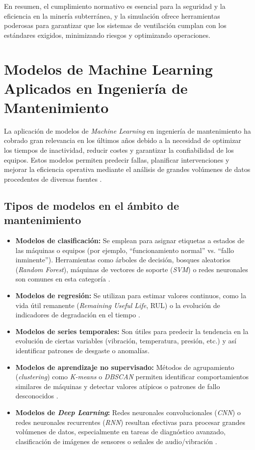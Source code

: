 En resumen, el cumplimiento normativo es esencial para la seguridad y la eficiencia en la minería subterránea, y la simulación ofrece herramientas poderosas para garantizar que los sistemas de ventilación cumplan con los estándares exigidos, minimizando riesgos y optimizando operaciones.

\section{Modelos de Machine Learning Aplicados en Ingeniería de Mantenimiento}

La aplicación de modelos de \textit{Machine Learning} en ingeniería de mantenimiento ha cobrado gran relevancia en los últimos años debido a la necesidad de optimizar los tiempos de inactividad, reducir costes y garantizar la confiabilidad de los equipos. Estos modelos permiten predecir fallas, planificar intervenciones y mejorar la eficiencia operativa mediante el análisis de grandes volúmenes de datos procedentes de diversas fuentes \cite{bishop2006, montgomery2009}.

\subsection{Tipos de modelos en el ámbito de mantenimiento}

\begin{itemize}
    \item \textbf{Modelos de clasificación:} Se emplean para asignar etiquetas a estados de las máquinas o equipos (por ejemplo, “funcionamiento normal” vs. “fallo inminente”). Herramientas como árboles de decisión, bosques aleatorios (\textit{Random Forest}), máquinas de vectores de soporte (\textit{SVM}) o redes neuronales son comunes en esta categoría \cite{zhang2020}.

    \item \textbf{Modelos de regresión:} Se utilizan para estimar valores continuos, como la vida útil remanente (\textit{Remaining Useful Life}, RUL) o la evolución de indicadores de degradación en el tiempo \cite{bishop2006}.

    \item \textbf{Modelos de series temporales:} Son útiles para predecir la tendencia en la evolución de ciertas variables (vibración, temperatura, presión, etc.) y así identificar patrones de desgaste o anomalías.

    \item \textbf{Modelos de aprendizaje no supervisado:} Métodos de agrupamiento (\textit{clustering}) como \textit{K-means} o \textit{DBSCAN} permiten identificar comportamientos similares de máquinas y detectar valores atípicos o patrones de fallo desconocidos \cite{montgomery2009}.

    \item \textbf{Modelos de \textit{Deep Learning}:} Redes neuronales convolucionales (\textit{CNN}) o redes neuronales recurrentes (\textit{RNN}) resultan efectivas para procesar grandes volúmenes de datos, especialmente en tareas de diagnóstico avanzado, clasificación de imágenes de sensores o señales de audio/vibración \cite{zhang2020}.
\end{itemize}

